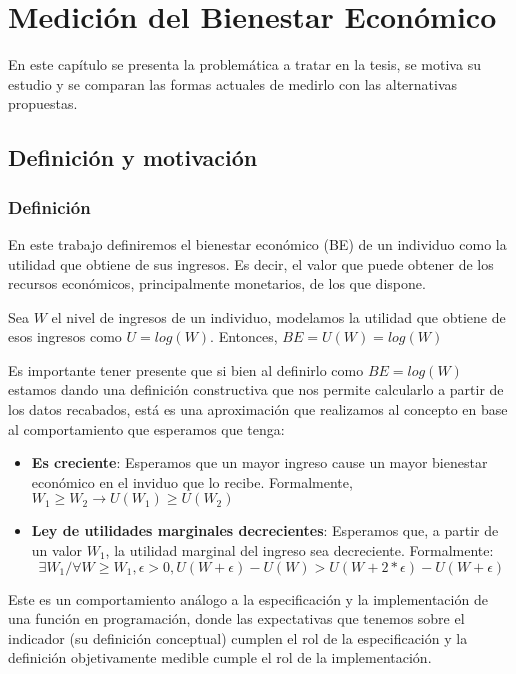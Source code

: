 \chapter{Medición del Bienestar Económico} \label{chapter:mediciones_bienestar_economico}

En este capítulo se presenta la problemática a tratar en la tesis, se motiva su estudio y se comparan las formas actuales de medirlo con las alternativas propuestas.

\section{Definición y motivación}

\subsection{Definición}

En este trabajo definiremos el bienestar económico (BE) de un individuo como la utilidad que obtiene de sus ingresos. Es decir, el valor que puede obtener de los recursos económicos, principalmente monetarios, de los que dispone.

Sea $W$ el nivel de ingresos de un individuo, modelamos la utilidad que obtiene de esos ingresos como $U = log(W)$. Entonces, $BE = U(W) = log(W)$

Es importante tener presente que si bien al definirlo como $BE = log(W)$ estamos dando una definición constructiva que nos permite calcularlo a partir de los datos recabados, está es una aproximación que realizamos al concepto en base al comportamiento que esperamos que tenga:

\begin{itemize}
    \item \textbf{Es creciente}: Esperamos que un mayor ingreso cause un mayor bienestar económico en el inviduo que lo recibe. Formalmente, $W_1 \geq W_2 \rightarrow U(W_1) \geq U(W_2)$
    \item \textbf{Ley de utilidades marginales decrecientes}: Esperamos que, a partir de un valor $W_1$, la utilidad marginal del ingreso sea decreciente. Formalmente:
    $$
    \exists W_1 / \forall W \geq W_1, \epsilon > 0, U(W+\epsilon)-U(W) > U(W+2*\epsilon)-U(W+\epsilon)
    $$
\end{itemize}

Este es un comportamiento análogo a la especificación y la implementación de una función en programación, donde las expectativas que tenemos sobre el indicador (su definición conceptual) cumplen el rol de la especificación y la definición objetivamente medible cumple el rol de la implementación.

